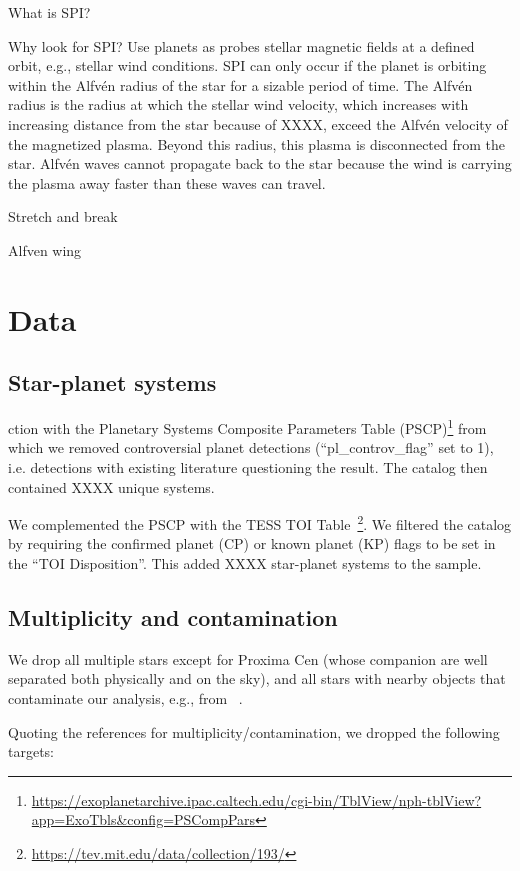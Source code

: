 \documentclass[twocolumn]{aastex631}
\begin{document}
What is SPI?

Why look for SPI? Use planets as probes stellar magnetic fields at a defined orbit, e.g., stellar wind conditions. SPI can only occur if the planet is orbiting within the Alfv\'en radius of the star for a sizable period of time. The Alfv\'en radius is the radius at which the stellar wind velocity, which increases with increasing distance from the star because of XXXX, exceed the Alfv\'en velocity of the magnetized plasma. Beyond this radius, this plasma is disconnected from the star. Alfv\'en waves cannot propagate back to the star because the wind is carrying the plasma away faster than these waves can travel.

Stretch and break


Alfven wing



\section{Data}
\label{sec:data}
\subsection{Star-planet systems}


ction with the Planetary Systems Composite Parameters Table (PSCP)\footnote{ \url{https://exoplanetarchive.ipac.caltech.edu/cgi-bin/TblView/nph-tblView?app=ExoTbls&config=PSCompPars}} from which we removed controversial planet detections (``pl\_controv\_flag'' set to 1), i.e. detections with existing literature questioning the result. The catalog then contained XXXX unique systems.

We complemented the PSCP with the TESS TOI Table~\citep[TT][]{guerrero2021arxiv}\footnote{\url{https://tev.mit.edu/data/collection/193/}}. We filtered the catalog by requiring the confirmed planet (CP) or known planet (KP) flags to be set in the ``TOI Disposition''. This added XXXX star-planet systems to the sample.
\subsection{Multiplicity and contamination}
We drop all multiple stars except for Proxima Cen (whose companion are well separated both physically and on the sky), and all stars with nearby objects that contaminate our analysis, e.g., from ~\citet{ziegler2018measuring}.

Quoting the references for multiplicity/contamination, we dropped the following targets: 
\end{document}
